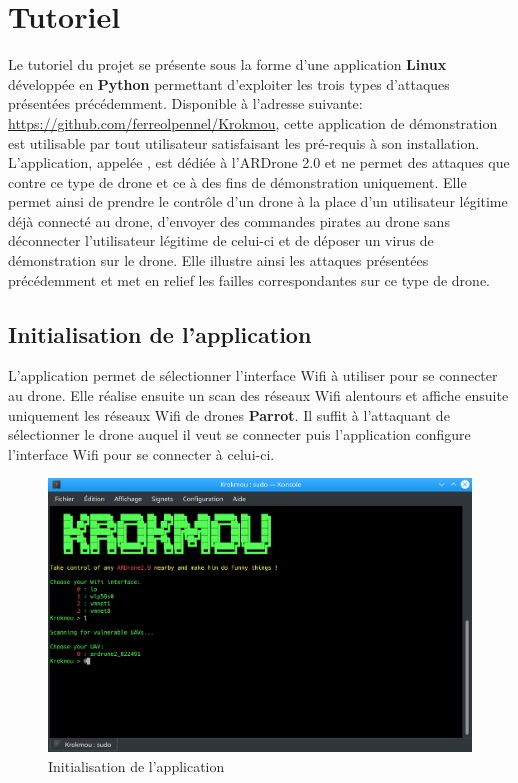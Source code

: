 \section{Tutoriel}
Le tutoriel du projet se présente sous la forme d'une application \textbf{Linux} développée en \textbf{Python} permettant d'exploiter les trois types d'attaques présentées précédemment. Disponible à l'adresse suivante: \url{https://github.com/ferreolpennel/Krokmou}, cette application de démonstration est utilisable par tout utilisateur satisfaisant les pré-requis à son installation. L'application, appelée , est dédiée à l'ARDrone 2.0 et ne permet des attaques que contre ce type de drone et ce à des fins de démonstration uniquement. Elle permet ainsi de prendre le contrôle d'un drone à la place d'un utilisateur légitime déjà connecté au drone, d'envoyer des commandes pirates au drone sans déconnecter l'utilisateur légitime de celui-ci et de déposer un virus de démonstration sur le drone. Elle illustre ainsi les attaques présentées précédemment et met en relief les failles correspondantes sur ce type de drone.

\subsection{Initialisation de l'application}
L'application permet de sélectionner l'interface Wifi à utiliser pour se connecter au drone. Elle réalise ensuite un scan des réseaux Wifi alentours et affiche ensuite uniquement les réseaux Wifi de drones \textbf{Parrot}. Il suffit à l'attaquant de sélectionner le drone auquel il veut se connecter puis l'application configure l'interface Wifi pour se connecter à celui-ci.

\begin{figure}[H]
  \centering
  \includegraphics[scale=0.35]{images/opening.png}
  \caption{Initialisation de l'application}
\end{figure}

